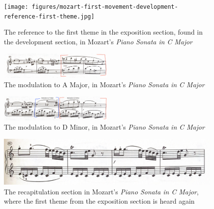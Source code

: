 \begin{figure}
    \centering
    \texttt{[image: figures/mozart-first-movement-development-reference-first-theme.jpg]}
    \caption{The reference to the first theme in the exposition section, found in the development section, in Mozart's \textit{Piano Sonata in C Major}}
    \label{fig:mozart-first-movement-development-reference-first-theme}
\end{figure}

\begin{figure}
    \centering
    \includegraphics[width=0.5\textwidth]{figures/mozart-first-movement-modulation-a-major.jpg}
    \caption{The modulation to A Major, in Mozart's \textit{Piano Sonata in C Major}}
    \label{fig:mozart-first-movement-modulation-a-major}
\end{figure}

\begin{figure}
    \centering
\includegraphics[width=0.5\textwidth]{figures/mozart-first-movement-f-major-d-minor.jpg}
    \caption{The modulation to D Minor, in Mozart's \textit{Piano Sonata in C Major}}
    \label{fig:mozart-first-movement-f-major-d-minor}
\end{figure}

\begin{figure}
    \centering
    \includegraphics[width=\textwidth]{figures/mozart-first-movement-recapitulation-first-theme.jpg}
    \caption[The first theme of the exposition, found in the recapitulation, from Mozart's \textit{Piano Sonata in C Major, K. 330}]{The recapitulation section in Mozart's \textit{Piano Sonata in C Major}, where the first theme from the exposition section is heard again}
    \label{fig:mozart-first-movement-recapitulation-first-theme}
\end{figure}

